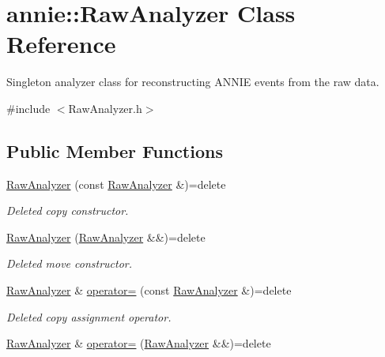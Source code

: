\hypertarget{classannie_1_1RawAnalyzer}{\section{annie\-:\-:Raw\-Analyzer Class Reference}
\label{classannie_1_1RawAnalyzer}
}


Singleton analyzer class for reconstructing A\-N\-N\-I\-E events from the raw data.  




{\ttfamily \#include $<$Raw\-Analyzer.\-h$>$}

\subsection*{Public Member Functions}
\begin{DoxyCompactItemize}
\item 
\hypertarget{classannie_1_1RawAnalyzer_a33b76c5b9f153a2e66c6b027e1cbd389}{\hyperlink{classannie_1_1RawAnalyzer_a33b76c5b9f153a2e66c6b027e1cbd389}{Raw\-Analyzer} (const \hyperlink{classannie_1_1RawAnalyzer}{Raw\-Analyzer} \&)=delete}\label{classannie_1_1RawAnalyzer_a33b76c5b9f153a2e66c6b027e1cbd389}

\begin{DoxyCompactList}\small\item\em Deleted copy constructor. \end{DoxyCompactList}\item 
\hypertarget{classannie_1_1RawAnalyzer_a36a51e84037253f7ff77ffff43fbc628}{\hyperlink{classannie_1_1RawAnalyzer_a36a51e84037253f7ff77ffff43fbc628}{Raw\-Analyzer} (\hyperlink{classannie_1_1RawAnalyzer}{Raw\-Analyzer} \&\&)=delete}\label{classannie_1_1RawAnalyzer_a36a51e84037253f7ff77ffff43fbc628}

\begin{DoxyCompactList}\small\item\em Deleted move constructor. \end{DoxyCompactList}\item 
\hypertarget{classannie_1_1RawAnalyzer_a078e7f5f170bff5f84d4e1404c250709}{\hyperlink{classannie_1_1RawAnalyzer}{Raw\-Analyzer} \& \hyperlink{classannie_1_1RawAnalyzer_a078e7f5f170bff5f84d4e1404c250709}{operator=} (const \hyperlink{classannie_1_1RawAnalyzer}{Raw\-Analyzer} \&)=delete}\label{classannie_1_1RawAnalyzer_a078e7f5f170bff5f84d4e1404c250709}

\begin{DoxyCompactList}\small\item\em Deleted copy assignment operator. \end{DoxyCompactList}\item 
\hypertarget{classannie_1_1RawAnalyzer_acf65e1d32f968d71627b96c1ead0c29e}{\hyperlink{classannie_1_1RawAnalyzer}{Raw\-Analyzer} \& \hyperlink{classannie_1_1RawAnalyzer_acf65e1d32f968d71627b96c1ead0c29e}{operator=} (\hyperlink{classannie_1_1RawAnalyzer}{Raw\-Analyzer} \&\&)=delete}\label{classannie_1_1RawAnalyzer_acf65e1d32f968d71627b96c1ead0c29e}


\end{DoxyCompactItemize}
